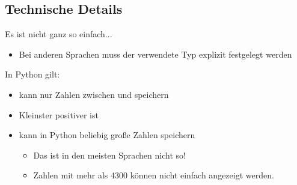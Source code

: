 \subsection{Technische Details}
\begin{frame} %
    \slidehead
    Es ist nicht ganz so einfach...

    \begin{itemize}
        \item Bei anderen Sprachen muss der verwendete Typ explizit festgelegt werden %
    \end{itemize}

    \pause
    In Python gilt:
    \begin{itemize}
        \item {} kann nur Zahlen zwischen  und  speichern
        \item Kleinster positiver  ist 
            \pause
        \item {} kann in Python beliebig große Zahlen speichern
            \begin{itemize}
                \item Das ist in den meisten Sprachen nicht so!
                    \pause
                \item Zahlen mit mehr als 4300 können nicht einfach angezeigt werden.
            \end{itemize}

    \end{itemize}
\end{frame}





